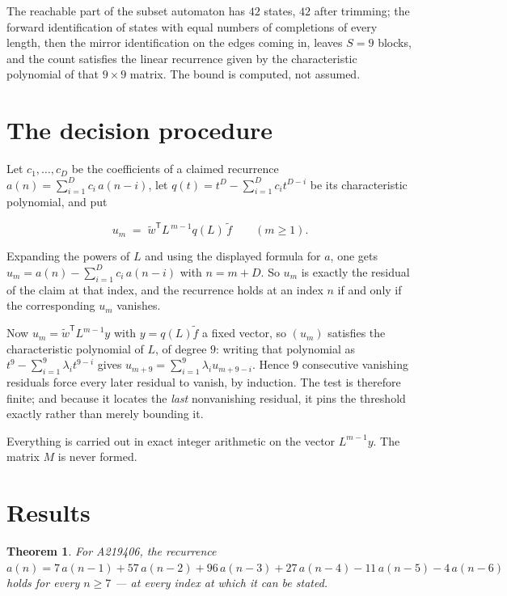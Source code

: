 \documentclass[11pt]{article}
\newtheorem{theorem}{Theorem}
\theoremstyle{definition}
\begin{document}
The reachable part of the subset automaton has $42$ states, $42$ after trimming; the forward identification of states with equal numbers of completions of every length, then the mirror identification on the edges coming in, leaves $S = 9$ blocks, and the count satisfies the linear recurrence given by the characteristic polynomial of that $9\times9$ matrix. The bound is computed, not assumed.

\section{The decision procedure}

Let $c_1,\dots,c_D$ be the coefficients of a claimed recurrence $a(n) = \sum_{i=1}^{D} c_i\,a(n-i)$, let $q(t) = t^{D} - \sum_{i=1}^{D} c_i t^{D-i}$ be its characteristic polynomial, and put

\[u_m \;=\; \tilde w^{\mathsf T} L^{\,m-1} q(L)\,\tilde f \qquad (m \ge 1).\]

Expanding the powers of $L$ and using the displayed formula for $a$, one gets $u_m = a(n) - \sum_{i=1}^{D} c_i\,a(n-i)$ with $n = m + D$. So $u_m$ is exactly the residual of the claim at that index, and the recurrence holds at an index $n$ if and only if the corresponding $u_m$ vanishes.

Now $u_m = \tilde w^{\mathsf T} L^{m-1} y$ with $y = q(L)\tilde f$ a fixed vector, so $(u_m)$ satisfies the characteristic polynomial of $L$, of degree $9$: writing that polynomial as $t^{9} - \sum_{i=1}^{9} \lambda_i t^{9-i}$ gives $u_{m+9} = \sum_{i=1}^{9} \lambda_i u_{m+9-i}$. Hence $9$ consecutive vanishing residuals force every later residual to vanish, by induction. The test is therefore finite; and because it locates the {\itshape last} nonvanishing residual, it pins the threshold exactly rather than merely bounding it.

Everything is carried out in exact integer arithmetic on the vector $L^{m-1}y$. The matrix $M$ is never formed.

\section{Results}

\begin{theorem} For A219406, the recurrence $a(n) = 7\,a(n-1) + 57\,a(n-2) + 96\,a(n-3) + 27\,a(n-4) - 11\,a(n-5) - 4\,a(n-6)$ holds for every $n \ge 7$ --- at every index at which it can be stated.\end{theorem}
\end{document}
